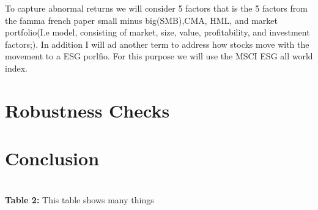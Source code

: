 \documentclass[12pt,oneside,reqno]{amsart}
\begin{document}
To capture abnormal returns we will consider 5 factors that is the 5 factors from the famma french paper small minus big(SMB),CMA, HML, and market portfolio(I.e model, consisting of market, size, value, profitability, and investment factors;). In addition I will ad another term to address how stocks move with the movement to a ESG porlfio. For this purpose we will use the MSCI ESG all world index. 
\section{Robustness Checks}
\label{Robustness}

\section{Conclusion}
\label{Conclusion}

{}


\\


\vspace{1cm}
\textbf{Table 2:} This table shows many things\\
\vspace{1cm}






\clearpage
\restoregeometry


%
\end{document}
